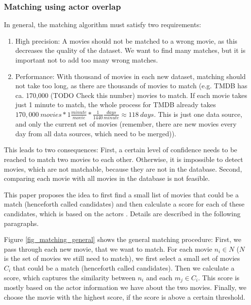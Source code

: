 \subsubsection{Matching using actor overlap}
In general, the matching algorithm must satisfy two requirements:
\begin{enumerate}
	\item{High precision:} A movies should not be matched to a wrong movie, as this decreases the quality of the dataset. We want to find many matches, but it is important not to add too many wrong matches.
	\item{Performance:} With thousand of movies in each new dataset, matching should not take too long, as there are thousands of movies to match (e.g. TMDB has ca. 170,000 (TODO Check this number) movies to match.
	If each movie takes just 1 minute to match, the whole process for TMDB already takes $170,000~movies * 1 \frac{minute}{movie} * \frac{1}{1440} \frac{days}{minute} \approx 118~days$.
	This is just one data source, and only the current set of movies (remember, there are new movies every day from all data sources, which need to be merged)).
\end{enumerate}

This leads to two consequences: First, a certain level of confidence needs to be reached to match two movies to each other. Otherwise, it is impossible to detect movies, which are not matchable, because they are not in the database.
Second, comparing each movie with all movies in the database is not feasible.

This paper proposes the idea to first find a small list of movies that could be a match (henceforth called candidates) and then calculate a score for each of these candidates, which is based on the actors . Details are described in the following paragraphs.

Figure \ref{fig_matching_general} shows the general matching procedure:
First, we pass through each new movie, that we want to match.
For each movie $n_i \in N$ ($N$ is the set of movies we still need to match), we first select a small set of movies $C_{i}$ that could be a match (henceforth called candidates).
Then we calculate a score, which captures the similarity between $n_i$ and each $m_j \in C_i$.
This score is mostly based on the actor information we have about the two movies.
Finally, we choose the movie with the highest score, if the score is above a certain threshold.

